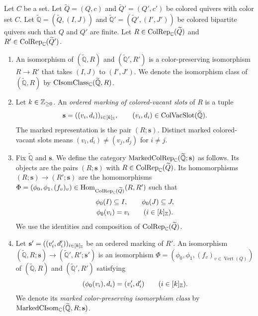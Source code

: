 \begin{definition}\label{def:colored-representation-markings}
Let $C$ be a set. Let $\widetilde Q=(Q,c)$ and $\widetilde Q'=(Q',c')$ be colored quivers with color set $C$.
Let $\widetilde{\mathbb Q}=(\widetilde Q,(I,J))$ and $\widetilde{\mathbb Q}'=(\widetilde Q',(I',J'))$ be colored bipartite quivers such that $Q$ and $Q'$ are finite.
Let $R\in\operatorname{ColRep}_{\mathbb C}(\widetilde Q)$ and $R'\in\operatorname{ColRep}_{\mathbb C}(\widetilde Q')$.
\begin{enumerate}[font=\itshape]
\item\label{d:unmarked-colored-rep-iso} An isomorphism of $(\widetilde{\mathbb Q},R)$ and $(\widetilde{\mathbb Q}',R')$ is a color-preserving isomorphism $R\to R'$ that takes $(I,J)$ to $(I',J')$.
We denote the isomorphism class of $(\widetilde{\mathbb Q},R)$ by
$\operatorname{CIsomClass}_{\mathbb C}(\widetilde{\mathbb Q},R)$.
\item\label{d:ordered-colored-marking} Let $k\in\mathbb Z_{\ge0}$. An \textit{ordered marking of colored-vacant slots} of $R$ is a tuple
\[
 \mathbf s=((v_i,d_i))_{i\in[k]_{\mathbb Z}},\qquad
 (v_i,d_i)\in\operatorname{ColVacSlot}(\widetilde{\mathbb Q}).
\]
The marked representation is the pair $(R;\mathbf s)$.
Distinct marked colored-vacant slots means $(v_i,d_i)\ne(v_j,d_j)$ for $i\ne j$.
\item\label{d:marked-rep-category} Fix $\widetilde{\mathbb Q}$ and $\mathbf s$. We define the category
$\operatorname{MarkedColRep}_{\mathbb C}(\widetilde{\mathbb Q};\mathbf s)$ as follows.
Its objects are the pairs $(R;\mathbf s)$ with $R\in\operatorname{ColRep}_{\mathbb C}(\widetilde Q)$.
Its homomorphisms $(R;\mathbf s)\to(R';\mathbf s)$ are the homomorphisms
$\Phi=(\phi_0,\phi_1,(f_v)_v)\in\operatorname{Hom}_{\operatorname{ColRep}_{\mathbb C}(\widetilde Q)}(R,R')$
such that
\[
\begin{gathered}
 \phi_0(I)\subseteq I,\qquad
 \phi_0(J)\subseteq J,\\
 \phi_0(v_i)=v_i\qquad(i\in[k]_{\mathbb Z}).
\end{gathered}
\]
We use the identities and composition of $\operatorname{ColRep}_{\mathbb C}(\widetilde Q)$.
\item\label{d:marked-rep-iso} Let $\mathbf s'=((v'_i,d'_i))_{i\in[k]_{\mathbb Z}}$ be an ordered marking of $R'$.
An isomorphism $(\widetilde{\mathbb Q},R;\mathbf s)\to(\widetilde{\mathbb Q}',R';\mathbf s')$ is an isomorphism
$\Phi=(\phi_0,\phi_1,(f_v)_{v\in\operatorname{Vert}(Q)})$
of $(\widetilde{\mathbb Q},R)$ and $(\widetilde{\mathbb Q}',R')$ satisfying
\[
 (\phi_0(v_i),d_i)=(v'_i,d'_i)\qquad(i\in[k]_{\mathbb Z}).
\]
We denote its \textit{marked color-preserving isomorphism class} by
$\operatorname{MarkedCIsom}_{\mathbb C}(\widetilde{\mathbb Q},R;\mathbf s)$.
\end{enumerate}
\end{definition}

